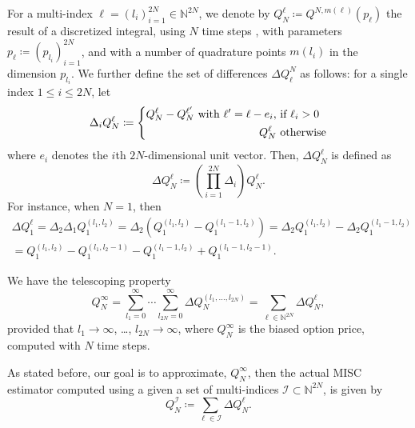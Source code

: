 
For a multi-index $\ell = (l_i)_{i=1}^{2N} \in \mathbb{N}^{2N}$, we denote  by
$Q_N^\ell \coloneqq Q^{N,m(\ell)}(p_{\ell})$ the result of a discretized
integral, using $N$ time steps , with parameters $p_\ell \coloneqq (p_{l_i})_{i=1}^{2N}$, and with a number of quadrature points $m(l_i)$ in the dimension $p_{l_i}$. We further define the set of
differences $\Delta Q^N_\ell$ as follows: for a single index $1 \le i \le 2N$,
let
\begin{equation}
\Delta_i Q_N^\ell \coloneqq \left\{ 
\aligned 
Q_N^{\ell} - Q_N^{\ell'} \text{ with } \ell' =\ell - e_i, & \text{ if } \ell_i>0 \\
Q_N^\ell & \text{ otherwise}
\endaligned
\right.
\end{equation}
where $e_i$ denotes the $i$th $2N$-dimensional unit vector. Then, $\Delta
Q_N^\ell$ is defined as
\begin{equation}
\Delta Q_N^\ell \coloneqq \left( \prod_{i=1}^{2N} \Delta_i \right) Q_N^\ell.
\end{equation}
For instance, when $N = 1$, then 
\begin{multline*}
	\Delta Q_1^\ell = \Delta_2 \Delta_1 Q_1^{(l_1, l_2)} = \Delta_2\left( Q_1^{(l_1,
		l_2)} - Q_1^{(l_1-1,l_2)} \right) = \Delta_2 Q_1^{(l_1,
		l_2)} - \Delta_2 Q_1^{(l_1-1,l_2)} 
	\\= Q_1^{(l_1, l_2)} - Q_1^{(l_1, l_2-1)} - Q_1^{(l_1-1, l_2)} + Q_1^{(l_1-1, l_2-1)}.
\end{multline*}

We have the telescoping property
\begin{equation}
Q_N^\infty = \sum_{l_1=0}^\infty \cdots \sum_{l_{2N} = 0}^\infty \Delta
Q_N^{(l_1, \ldots, l_{2N})} = \sum_{\ell \in \mathbb{N}^{2N}} \Delta Q_N^\ell,
\end{equation}
provided that $l_1 \to \infty$, \ldots,
$l_{2N} \to \infty$, where $Q^\infty_N$ is the biased option price, computed with $N$ time steps.

As stated before, our goal is to approximate, $Q_N^\infty$, then   the actual MISC estimator  computed using a  given a set of multi-indices $\mathcal{I} \subset
\mathbb{N}^{2N}$, is given by
\begin{equation*}
	Q_N^{\mathcal{I}} \coloneqq \sum_{\ell \in \mathcal{I}} \Delta Q_N^\ell.
\end{equation*}

